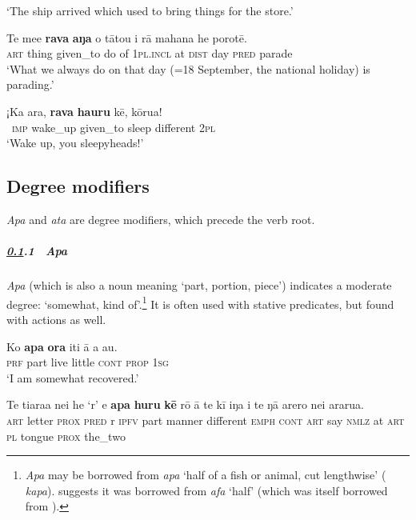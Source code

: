 \glt 
‘The ship arrived which used to bring things for the store.’ \textstyleExampleref{[R250.094]} 
\z

\ea\label{ex:7.87}
\gll Te me{\ꞌ}e \textbf{rava} \textbf{aŋa} o tātou {\ꞌ}i rā mahana he porotē. \\
\textsc{art} thing given\_to do of \textsc{1pl.incl} at \textsc{dist} day \textsc{pred} parade \\

\glt 
‘What we always do on that day (=18 September, the national holiday) is parading.’ \textstyleExampleref{[R334.309]} 
\z

\ea\label{ex:7.88}
\gll ¡Ka {\ꞌ}ara, \textbf{rava} \textbf{ha{\ꞌ}uru} kē, kōrua! \\
~\textsc{imp} wake\_up given\_to sleep different \textsc{2pl} \\

\glt 
‘Wake up, you sleepyheads!’ \textstyleExampleref{[Ley-4-05.008]}
\z
{}

\subsection{Degree modifiers} \label{sec:7.3.2}

\textit{{\ꞌ}Apa} and \textit{{\ꞌ}ata} are degree modifiers, which precede the verb root. 

\subparagraph{\ref{sec:7.3.2}.1~ \textit{{\ꞌ}Apa}} \textit{{\ꞌ}Apa} (which is also a noun meaning ‘part, portion, piece’) indicates a moderate degree: ‘somewhat, kind of’.\footnote{\label{fn:342}\textit{{\ꞌ}Apa} may be borrowed from  \textit{{\ꞌ}apa} ‘half of a fish or animal, cut lengthwise’ ( \textit{kapa}). \citet[315]{Fischer2001Hispan} suggests it was borrowed from  \textit{{\ꞌ}afa} ‘half’ (which was itself borrowed from ).} It is often used with stative predicates, but found with actions as well. 

\ea\label{ex:7.89}
\gll Ko \textbf{{\ꞌ}apa} \textbf{ora} {\ꞌ}iti {\ꞌ}ā a au. \\
\textsc{prf} part live little \textsc{cont} \textsc{prop} \textsc{1sg} \\

\glt 
‘I am somewhat recovered.’ \textstyleExampleref{[R231.325]} 
\z

\ea\label{ex:7.90}
\gll Te ti{\ꞌ}ara{\ꞌ}a nei he ‘r’ e \textbf{{\ꞌ}apa} \textbf{huru} \textbf{kē} rō {\ꞌ}ā te kī iŋa  {\ꞌ}i te ŋā {\ꞌ}arero nei ararua.\\
\textsc{art} letter \textsc{prox} \textsc{pred} r \textsc{ipfv} part manner different \textsc{emph} \textsc{cont} \textsc{art} say \textsc{nmlz}  at \textsc{art} \textsc{pl} tongue \textsc{prox} the\_two\\

